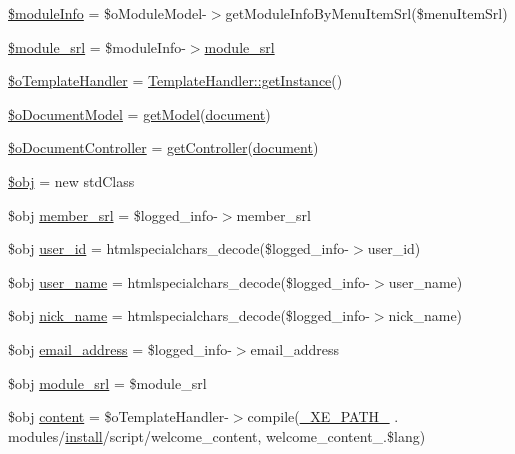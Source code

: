 \begin{DoxyCompactItemize}
\item 
\hyperlink{ko_8install_8php_ae3552a6dd49f37a50e7858151f7c5cc2}{\$module\+Info} = \$o\+Module\+Model-\/$>$get\+Module\+Info\+By\+Menu\+Item\+Srl(\$menu\+Item\+Srl)
\item 
\hyperlink{ko_8install_8php_ae40aed4d7a99050245e66ca2a82949ed}{\$module\+\_\+srl} = \$module\+Info-\/$>$\hyperlink{ko_8install_8php_a370bb6450fab1da3e0ed9f484a38b761}{module\+\_\+srl}
\item 
\hyperlink{ko_8install_8php_abd57e3ab220291ea9b5c16c2a4e0670e}{\$o\+Template\+Handler} = \hyperlink{classTemplateHandler_a9745460c5daccfc48abf8652778b2718}{Template\+Handler\+::get\+Instance}()
\item 
\hyperlink{ko_8install_8php_afb18aa87e5520385e76377e876e042af}{\$o\+Document\+Model} = \hyperlink{func_8inc_8php_aecdfcc5332bcf22df01fc21a03b64435}{get\+Model}(\textquotesingle{}\hyperlink{classdocument}{document}\textquotesingle{})
\item 
\hyperlink{ko_8install_8php_aac43fce682d4b7a05df6d3e44c2c54e6}{\$o\+Document\+Controller} = \hyperlink{func_8inc_8php_aa08f01e3bf130d770b373ca8493e3e9b}{get\+Controller}(\textquotesingle{}\hyperlink{classdocument}{document}\textquotesingle{})
\item 
\hyperlink{ko_8install_8php_a9008ed94ba185855b1723e367744b87e}{\$obj} = new std\+Class
\item 
\$obj \hyperlink{ko_8install_8php_aa61f9e08f0fe505094d26f8143f30bbd}{member\+\_\+srl} = \$logged\+\_\+info-\/$>$member\+\_\+srl
\item 
\$obj \hyperlink{ko_8install_8php_a74f1a394389d774e5b4cd5d1d15413f7}{user\+\_\+id} = htmlspecialchars\+\_\+decode(\$logged\+\_\+info-\/$>$user\+\_\+id)
\item 
\$obj \hyperlink{ko_8install_8php_a115401aff7da80e73c66e9f76505426b}{user\+\_\+name} = htmlspecialchars\+\_\+decode(\$logged\+\_\+info-\/$>$user\+\_\+name)
\item 
\$obj \hyperlink{ko_8install_8php_a151ecae87a1f3d7e257aa089803086bd}{nick\+\_\+name} = htmlspecialchars\+\_\+decode(\$logged\+\_\+info-\/$>$nick\+\_\+name)
\item 
\$obj \hyperlink{ko_8install_8php_a1dffea0d5ba8194f8ef01f414af0c831}{email\+\_\+address} = \$logged\+\_\+info-\/$>$email\+\_\+address
\item 
\$obj \hyperlink{ko_8install_8php_a370bb6450fab1da3e0ed9f484a38b761}{module\+\_\+srl} = \$module\+\_\+srl
\item 
\$obj \hyperlink{ko_8install_8php_a65dddc3e5e47cb506e6b5417ffb3bdef}{content} = \$o\+Template\+Handler-\/$>$compile(\hyperlink{config_8inc_8php_a5387c7a3f2aa38adf16f324cee88db88}{\+\_\+\+X\+E\+\_\+\+P\+A\+T\+H\+\_\+} . \textquotesingle{}modules/\hyperlink{classinstall}{install}/script/welcome\+\_\+content\textquotesingle{}, \textquotesingle{}welcome\+\_\+content\+\_\+\textquotesingle{}.\$lang)

\end{DoxyCompactItemize}
